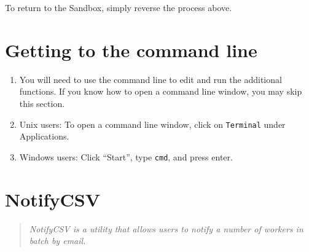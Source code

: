 \documentclass[10pt]{article}
\begin{document}
To return to the Sandbox, simply reverse the process above. 

\section*{Getting to the command line}

\begin{enumerate}
	\item You will need to use the command line to edit and run the additional functions. If you know how to open a command line window, you may skip this section.
	\item Unix users: To open a command line window, click on \verb+Terminal+ under Applications.
	\item Windows users: Click ``Start'', type \verb+cmd+, and press enter.
\end{enumerate}

\section*{NotifyCSV}

\begin{quotation}
\noindent \emph{NotifyCSV is a utility that allows users to notify a number of workers in batch by email.}
\end{quotation}
\end{document}

